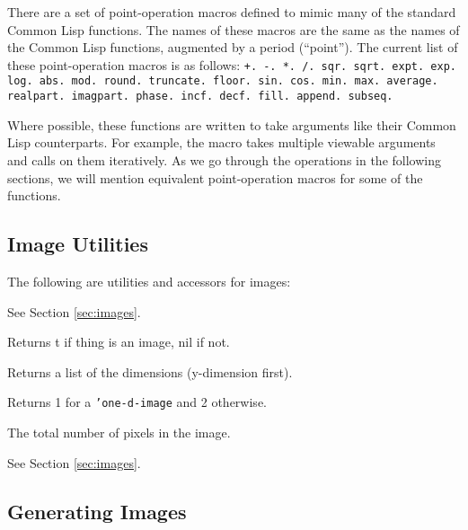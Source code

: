 There are a set of point-operation macros defined to mimic many of the
standard Common Lisp functions.  The names of these macros are the
same as the names of the Common Lisp functions, augmented by a period
(``point'').  The current list of these point-operation macros is as
follows: {\tt +. -. *. /. sqr. sqrt.  expt. exp. log.  abs.  mod.
round. truncate. floor.
sin. cos. min. max. average. realpart. imagpart. phase.  incf. decf.
fill. append. subseq.} 

Where possible, these functions are written to take arguments like
their Common Lisp counterparts. For example, the macro  takes
multiple viewable arguments and calls  on them iteratively.
As we go through the operations in the following sections, we will
mention equivalent point-operation macros for some of the functions.

\subsection{Image Utilities}

The following are utilities and accessors for images: 
\begin{description}
\item{}
See Section \ref{sec:images}.

\item{}
Returns t if thing is an image, nil if not.

\item{}
Returns a list of the dimensions (y-dimension first).

\item{}
Returns 1 for a {\tt 'one-d-image} and 2 otherwise.

\item{}

\item{}

\item{}
The total number of pixels in the image.

\item{}
See Section \ref{sec:images}.
\end{description}

\subsection{Generating Images}

